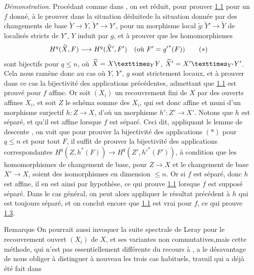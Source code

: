 \documentclass[10pt]{../fichiers-configuration-latex/smfart}
\begin{document}
\noindent
\emph{Démonstration}. Procédant comme dans , on est réduit,
pour prouver \hyperref[XVI.thm1.1]{1.1} pour un $f$ donné, à le prouver dans la situation
déduite\pageoriginale de la situation donnée par des changements de
base $\widetilde{Y}\rightarrow Y$, $\widetilde{Y}'\rightarrow Y'$,
pour un morphisme local $\widetilde{g}:\widetilde{Y}'\rightarrow
\widetilde{Y}$ de localisés stricts de $Y'$, $Y$ induit par $g$, et à
prouver que les homomorphismes
\begin{equation*}
H^{q}(\widetilde{X},F)\longrightarrow H^{q}(\widetilde{X}',F')\quad
(\mbox{\rm où } F'={g'}^{\ast}(F))\tag{$\ast$}
\end{equation*}
sont bijectifs pour $q\leq n$, où $\widetilde{X}=\fprod{X}{Y}{Y}$,
$\widetilde{X}'=\fprod{X'}{Y'}{Y'}$. Cela nous ramène donc au cas où
$Y$, $Y'$, $g$ sont strictement locaux, et à prouver dans ce cas la
bijectivité des applications précédentes, admettant que
\hyperref[XVI.thm1.1]{1.1} est prouvé 
pour $f$ affine. Or soit $(X_i)$ un recouvrement fini de $X$ par des
ouverts affines $X_i$, et soit $Z$ le schéma somme des $X_i$, qui est
donc affine et muni d'un morphisme surjectif $h:Z\rightarrow X$, d'où
un morphisme $h':Z'\rightarrow X'$. Notons que $h$ est séparé, et
qu'il est affine lorsque $f$ est séparé. Ceci dit, appliquant le lemme
de descente , on voit que pour prouver la bijectivité des
applications $(\ast)$ pour $q\leq n$ et pour tout $F$, il suffit de
prouver la bijectivité des applications correspondantes
$H^{q}(Z,h^{\ast}(F))\rightarrow H^{q}(Z',{h'}^{\ast}(F'))$, à
condition que les homomorphismes de changement de base, pour
$Z\rightarrow X$ et le changement de base $X'\rightarrow X$, soient
des isomorphismes en dimension $\leq n$. Or si $f$ est séparé, donc
$h$ est affine, il en est ainsi par hypothèse, ce qui prouve \hyperref[XVI.thm1.1]{1.1}
lorsque $f$ est supposé séparé. Dans le cas général, on peut alors
appliquer le résultat précédent à $h$ qui est toujours séparé, et on
conclut encore que \hyperref[XVI.thm1.1]{1.1} est vrai pour $f$, ce qui prouve \hyperref[XVI.lem1.3]{1.3}.

\begin{enonce*}[remark]{Remarque}
On pourrait aussi invoquer la suite spectrale de Leray pour le
recouvrement ouvert $(X_i)$ de $X$, et ses variantes non
commutatives,\pageoriginale mais cette méthode, qui n'est pas
essentiellement différente du recours à , a le désavantage de
nous obliger à distinguer à nouveau les trois cas habituels, travail
qui a déjà été fait dans \loccit
\end{enonce*}
\end{document}
